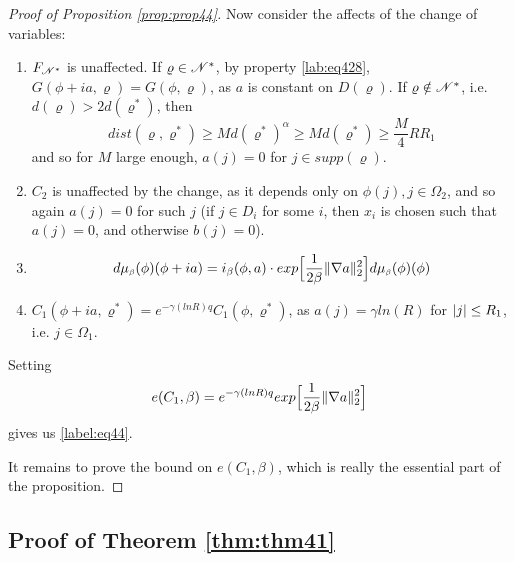 \documentclass[11pt,reqno]{article}
\DeclarePairedDelimiter\abs{\lvert}{\rvert}%
\DeclarePairedDelimiter\norm{\lVert}{\rVert}%
\theoremstyle{definition}
\numberwithin{equation}{section}
\begin{document}
\begin{proof}[Proof of Proposition \eqref{prop:prop44}]
Now consider the affects of the change of variables:
\begin{enumerate}[label={\alph*)}]
\item $F_{\mathscr{N}^*}$ is unaffected. If $\varrho \in \mathscr{N}^*$, by property \eqref{lab:eq428}, $G(\phi+ia, \varrho) = G(\phi, \varrho)$, as $a$ is constant on $D(\varrho)$. If $\varrho \notin \mathscr{N}^*$, i.e. $d(\varrho) > 2d(\varrho^*)$, then
$$
dist(\varrho, \varrho^*) \geq Md(\varrho^*)^\alpha \geq Md(\varrho^*) \geq \frac{M}{4}RR_1
$$
and so for $M$ large enough, $a(j)=0$ for $j \in supp(\varrho)$.
\item $C_2$ is unaffected by the change, as it depends only on $\phi(j), j\in \Omega_2$, and so again $a(j)=0$ for such $j$ (if $j \in D_i$ for some $i$, then $x_i$ is chosen such that $a(j)=0$, and otherwise $b(j)=0$).
\item 
$$
\mida(\phi + ia) = i_\beta(\phi, a) \cdot exp\Big[\frac{1}{2\beta} \norm{\nabla a}_2^2 \Big]\mida(\phi)
$$
\item $C_1(\phi+ia, \varrho^*) = e^{-\gamma (lnR) q} C_1(\phi, \varrho^*)$, as $a(j)=\gamma ln(R)$ for $\abs{j} \leq R_1$, i.e. $j \in \Omega_1$.
\end{enumerate}
Setting 
$$
e(C_1, \beta) = e^{-\gamma (lnR) q} exp\Big[\frac{1}{2\beta} \norm{\nabla a}_2^2 \Big]
$$
gives us \eqref{label:eq44}.

It remains to prove the bound on $e(C_1, \beta)$, which is really the essential part of the proposition.

\end{proof}

\subsection{Proof of Theorem \eqref{thm:thm41}}
\end{document}
